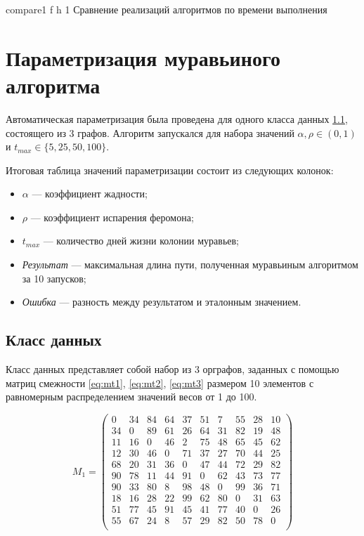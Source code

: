 {compare1} %
{f} %
{h} %
{1\textwidth} %
{Сравнение реализаций алгоритмов по времени выполнения} %

\clearpage

\section{Параметризация муравьиного алгоритма}

Автоматическая параметризация была проведена для одного класса данных \ref{par:class1}, состоящего из 3 графов. Алгоритм запускался для набора значений $\alpha, \rho \in (0, 1)$ и $t_{max} \in \{5, 25, 50, 100\}$.

Итоговая таблица значений параметризации состоит из следующих колонок:
\begin{itemize}
	\item $\alpha$ --- коэффициент жадности;
	\item $\rho$ --- коэффициент испарения феромона;
	\item $t_{max}$ --- количество дней жизни колонии муравьев;
	\item \textit{Результат} --- максимальная длина пути, полученная муравьиным алгоритмом за 10 запусков;
	\item \textit{Ошибка} --- разность между результатом и эталонным значением.
\end{itemize}

\subsection{Класс данных}\label{par:class1}

Класс данных представляет собой набор из 3 орграфов, заданных с помощью матриц смежности \eqref{eq:mt1}, \eqref{eq:mt2}, \eqref{eq:mt3} размером 10 элементов с равномерным распределением значений весов от 1 до 100.

\begin{equation}
	\label{eq:mt1}
	M_1 = 
	\begin{pmatrix}
		0 & 34 & 84 & 64 & 37 & 51 & 7 & 55 & 28 & 10 \\
		34 & 0 & 89 & 61 & 26 & 64 & 31 & 82 & 19 & 48 \\
		11 & 16 & 0 & 46 & 2 & 75 & 48 & 65 & 45 & 62 \\
		12 & 30 & 46 & 0 & 71 & 37 & 27 & 70 & 44 & 25 \\
		68 & 20 & 31 & 36 & 0 & 47 & 44 & 72 & 29 & 82 \\
		90 & 78 & 11 & 44 & 91 & 0 & 62 & 43 & 73 & 77 \\
		90 & 33 & 80 & 8 & 98 & 48 & 0 & 99 & 36 & 71 \\
		18 & 16 & 28 & 22 & 99 & 62 & 80 & 0 & 31 & 63 \\
		51 & 77 & 45 & 91 & 45 & 41 & 77 & 40 & 0 & 26 \\
		55 & 67 & 24 & 8 & 57 & 29 & 82 & 50 & 78 & 0 \\
	\end{pmatrix}
\end{equation}

